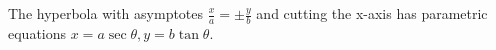  The hyperbola with asymptotes $  \frac{x}{a} = \pm \frac{y}{b} $
and cutting the x-axis
has parametric equations  $ x = a \sec \theta , 
y= b \tan \theta . $
